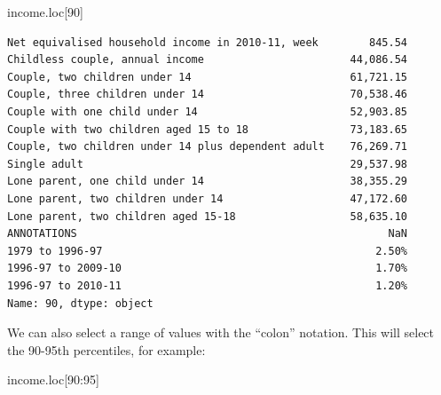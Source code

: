 \documentclass[
  letterpaper,
  DIV=11,
  numbers=noendperiod]{scrreprt}
\newenvironment{Shaded}{\begin{snugshade}}{\end{snugshade}}
\newcommand{\DecValTok}[1]{\textcolor[rgb]{0.68,0.00,0.00}{#1}}
\newcommand{\NormalTok}[1]{\textcolor[rgb]{0.00,0.23,0.31}{#1}}
\begin{document}
\begin{Shaded}
\begin{Highlighting}[]
\NormalTok{income.loc[}\DecValTok{90}\NormalTok{]}
\end{Highlighting}
\end{Shaded}

\begin{verbatim}
Net equivalised household income in 2010-11, week        845.54
Childless couple, annual income                       44,086.54
Couple, two children under 14                         61,721.15
Couple, three children under 14                       70,538.46
Couple with one child under 14                        52,903.85
Couple with two children aged 15 to 18                73,183.65
Couple, two children under 14 plus dependent adult    76,269.71
Single adult                                          29,537.98
Lone parent, one child under 14                       38,355.29
Lone parent, two children under 14                    47,172.60
Lone parent, two children aged 15-18                  58,635.10
ANNOTATIONS                                                 NaN
1979 to 1996-97                                           2.50%
1996-97 to 2009-10                                        1.70%
1996-97 to 2010-11                                        1.20%
Name: 90, dtype: object
\end{verbatim}

We can also select a range of values with the ``colon'' notation. This
will select the 90-95th percentiles, for example:

\begin{Shaded}
\begin{Highlighting}[]
\NormalTok{income.loc[}\DecValTok{90}\NormalTok{:}\DecValTok{95}\NormalTok{]}
\end{Highlighting}
\end{Shaded}
\end{document}
